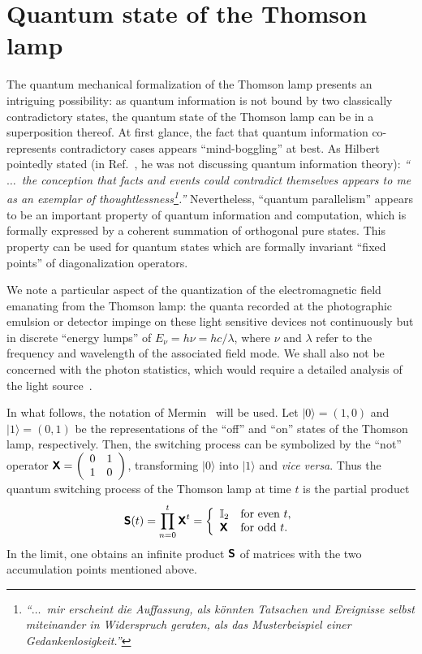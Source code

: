 \documentclass{llncs}
\begin{document}
\section{Quantum state of the Thomson lamp}

The quantum mechanical formalization of the Thomson lamp presents an intriguing possibility: as quantum information is not bound by two classically contradictory states,
the quantum state of the Thomson lamp can be in a superposition thereof.
At first glance, the fact that quantum information co-represents contradictory cases appears ``mind-boggling'' at best.
As Hilbert pointedly stated (in Ref.~\cite[p.~163]{hilbert-26}, he was not discussing quantum information theory):
{\em ``$\ldots$~the conception that facts and events could contradict
themselves appears to me as an exemplar of thoughtlessness\footnote{
{\em ``$\ldots$~mir erscheint die Auffassung, als k{\"{o}}nnten Tatsachen und Ereignisse selbst miteinander in Widerspruch
geraten, als das Musterbeispiel einer Gedankenlosigkeit.''}}.''}
Nevertheless,  ``quantum parallelism'' appears to be an important property of quantum information and computation,
which is formally expressed by a coherent summation of orthogonal pure states.
This property can be used for quantum states which are formally invariant ``fixed points'' of diagonalization operators.

We note a particular
aspect of the quantization of the electromagnetic field emanating from the Thomson lamp:
the quanta recorded at the photographic emulsion or detector
impinge on these light sensitive devices not continuously but in discrete ``energy lumps'' of $E_\nu = h \nu = hc/\lambda$,
where $\nu$ and $\lambda$ refer to the frequency
and wavelength of the associated field mode.
We shall also not be concerned with the photon statistics,
which would require a detailed analysis of the light source~\cite{Mandel-Wolf}.

In what follows, the notation of Mermin~\cite{mermin-07} will be used.
Let $\vert 0\rangle = (1,0)$ and $\vert 1\rangle = (0,1)$ be the representations of the ``off'' and ``on''
states of the Thomson lamp, respectively.
Then, the switching process can be symbolized by the ``not'' operator
$\textsf{\textbf{X}}=
\left(
\begin{array}{cc}
0&1\\
1&0
\end{array}
\right)$, transforming $\vert 0\rangle$ into $\vert 1\rangle$ and {\it vice versa}.
Thus the quantum switching process of the Thomson lamp at time $t$ is the partial product~\cite[Sect.~5.11]{arfken05}
\begin{equation}
\textsf{\textbf{S}}(t)
= \prod_{n=0}^t
\textsf{\textbf{X}}^t=   \left\{
\begin{array}{ll}
{\Bbb I}_2 &\textrm{for even $t$,}
\\ \textsf{\textbf{X}} &\textrm{for odd $t$.}
\end{array}
\right.
\end{equation}
In the limit, one obtains an infinite product $\textsf{\textbf{S}}$ of matrices with the two accumulation points mentioned above.
\end{document}
